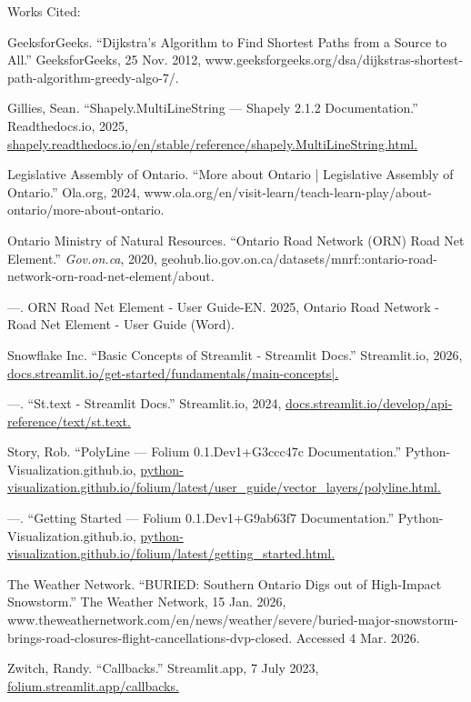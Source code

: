 \documentclass[fontsize=11pt]{article}
\begin{document}
\begin{doublespacing}
\fontsize{12}{16}\selectfont

\begin{center}
Works Cited:
\end{center}
\noindent
\hangindent=0.5in
GeeksforGeeks. “Dijkstra’s Algorithm to Find Shortest Paths from a Source to All.” GeeksforGeeks, 25 Nov. 2012, www.geeksforgeeks.org/dsa/dijkstras-shortest-path-algorithm-greedy-algo-7/.

\noindent
\hangindent=0.5in
Gillies, Sean. “Shapely.MultiLineString — Shapely 2.1.2 Documentation.” Readthedocs.io, 2025, \url{shapely.readthedocs.io/en/stable/reference/shapely.MultiLineString.html.} 

\noindent
\hangindent=0.5in
Legislative Assembly of Ontario. “More about Ontario | Legislative Assembly of Ontario.” Ola.org, 2024, www.ola.org/en/visit-learn/teach-learn-play/about-ontario/more-about-ontario.

\noindent
\hangindent=0.5in
Ontario Ministry of Natural Resources. “Ontario Road Network (ORN) Road Net Element.” \textit{Gov.on.ca}, 2020, geohub.lio.gov.on.ca/datasets/mnrf::ontario-road-network-orn-road-net-element/about.

\noindent
\hangindent=0.5in
---. ORN Road Net Element - User Guide-EN. 2025, Ontario Road Network - Road Net Element - User Guide (Word).

\noindent
\hangindent=0.5in
Snowflake Inc. “Basic Concepts of Streamlit - Streamlit Docs.” Streamlit.io, 2026, \url{docs.streamlit.io/get-started/fundamentals/main-concepts|.}

\noindent
\hangindent=0.5in
---. “St.text - Streamlit Docs.” Streamlit.io, 2024, \url{docs.streamlit.io/develop/api-reference/text/st.text.}

\noindent
\hangindent=0.5in
Story, Rob. “PolyLine — Folium 0.1.Dev1+G3ccc47c Documentation.” Python-Visualization.github.io, \url{python-visualization.github.io/folium/latest/user\_guide/vector\_layers/polyline.html.}

\noindent
\hangindent=0.5in
---. “Getting Started — Folium 0.1.Dev1+G9ab63f7 Documentation.” Python-Visualization.github.io, \url{python-visualization.github.io/folium/latest/getting\_started.html.}

\noindent
\hangindent=0.5in
The Weather Network. “BURIED: Southern Ontario Digs out of High-Impact Snowstorm.” The Weather Network, 15 Jan. 2026, www.theweathernetwork.com/en/news/weather/severe/buried-major-snowstorm-brings-road-closures-flight-cancellations-dvp-closed. Accessed 4 Mar. 2026.

\noindent
\hangindent=0.5in
Zwitch, Randy. “Callbacks.” Streamlit.app, 7 July 2023, \url{folium.streamlit.app/callbacks.} 

\end{doublespacing}
\end{document}
